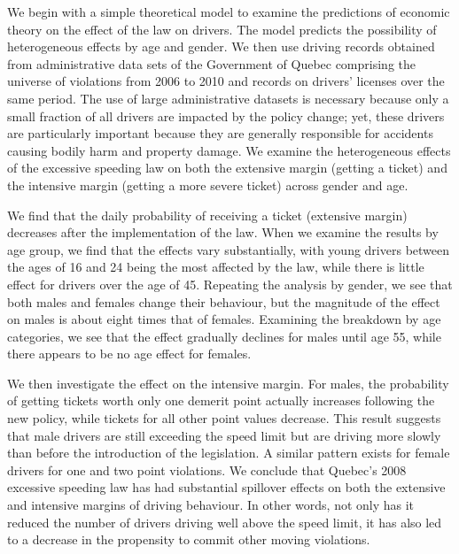 We begin with a simple theoretical model to examine the predictions of economic theory 
on the effect of the law on drivers. 
% 
The model predicts the possibility of heterogeneous effects by age and gender. 
% 
% 
We then use driving records obtained from administrative data sets 
of the Government of Quebec comprising the universe of violations 
from 2006 to 2010 and records on drivers’ licenses over the same period. 
The use of large administrative datasets is necessary because only a small fraction 
of all drivers are impacted by the policy change; 
yet, these drivers are particularly important because they are 
generally responsible for accidents causing bodily harm and property damage. 
We examine the heterogeneous effects of the excessive speeding law 
on both the extensive margin (getting a ticket) 
and the intensive margin (getting a more severe ticket) across gender and age. 
% 

We find that the daily probability of receiving a ticket (extensive margin) 
decreases after the implementation of the law. 
When we examine the results by age group, we find that the effects vary substantially, 
with young drivers between the ages of 16 and 24 being the most affected by the law, 
while there is little effect for drivers over the age of 45. 
Repeating the analysis by gender, we see that both males and females change their behaviour, 
but the magnitude of the effect on males is about eight times that of females. 
Examining the breakdown by age categories, we see that the effect gradually declines 
for males until age 55, while there appears to be no age effect for females. 

We then investigate the effect on the intensive margin. 
For males, the probability of getting tickets worth only one demerit point 
actually increases following the new policy, while tickets for all other point values decrease. 
This result suggests that male drivers are still exceeding the speed limit 
but are driving more slowly than before the introduction of the legislation. 
A similar pattern exists for female drivers for one and two point violations. 
We conclude that Quebec’s 2008 excessive speeding law has had substantial spillover effects 
on both the extensive and intensive margins of driving behaviour. 
In other words, not only has it reduced the number of drivers driving well above the speed limit, 
it has also led to a decrease in the propensity to commit other moving violations.

